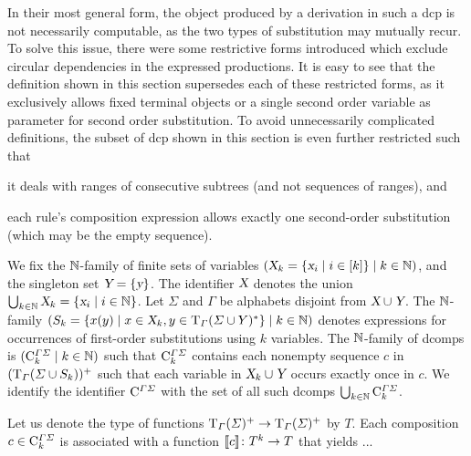 \documentclass[../document.tex]{subfiles}
\begin{document}
    In their most general form, the object produced by a derivation in such a \gls{dcp} is not necessarily computable, as the two types of substitution may mutually recur.
    To solve this issue, there were some restrictive forms introduced which exclude circular dependencies in the expressed productions. \cite{???}
    It is easy to see that the definition shown in this section supersedes each of these restricted forms, as it exclusively allows fixed terminal objects or a single second order variable as parameter for second order substitution.
    To avoid unnecessarily complicated definitions, the subset of \gls{dcp} shown in this section is even further restricted such that
    \begin{inparaenum}
        \item it deals with ranges of consecutive subtrees (and not sequences of ranges), and
        \item each rule's composition expression allows exactly one second-order substitution (which may be the empty sequence).
    \end{inparaenum}

    \begin{definition}[Composition]
        We fix the \(\mathbb{N}\)-\gls{family} of finite sets of variables \((\textsl{X}_k = \{\textsl{x}_i \mid i \in [k]\} \mid k \in \mathbb{N})\), and the singleton set \(\textsl{Y} = \{\textsl{y}\}\).
        The identifier \(\textsl{X}\) denotes the union \(\bigcup_{k \in \mathbb{N}} \textsl{X}_k = \{\textsl{x}_i \mid i \in \mathbb{N}\}\).
        Let \(\varSigma\) and \(\varGamma\) be alphabets disjoint from \(\textsl{X} \cup \textsl{Y}\).
        The \(\mathbb{N}\)-\gls{family} \((S_k = \{x(y) \mid x \in \textsl{X}_k, y \in \operatorname{T}_\varGamma(\varSigma \cup Y)^*\} \mid k \in \mathbb{N})\) denotes expressions for occurrences of first-order substitutions using \(k\) variables.
        The \(\mathbb{N}\)-\gls{family} of \glspl{dcomp} is \((\mathrm{C}^{\varGamma\varSigma}_k \mid k \in \mathbb{N})\) such that \(\mathrm{C}^{\varGamma\varSigma}_k\) contains each nonempty sequence \(c\) in \((\operatorname{T}_\varGamma(\varSigma \cup S_k))^+\) such that each variable in \(\textsl{X}_k \cup \textsl{Y}\) occurs exactly once in \(c\).
        We identify the identifier \(\mathrm{C}^{\varGamma\varSigma}\) with the set of all such \glspl*{dcomp} \(\bigcup_{k \in \mathbb{N}} \mathrm{C}^{\varGamma\varSigma}_{k}\).

        Let us denote the type of functions \(\operatorname{T}_\varGamma(\varSigma)^+ \to \operatorname{T}_\varGamma(\varSigma)^+\) by \(T\).
        Each composition \(c \in \mathrm{C}^{\varGamma\varSigma}_k\) is associated with a function \(\llbracket c\rrbracket\colon T^k \to T\) that yields ... 
    \end{definition}
\end{document}
